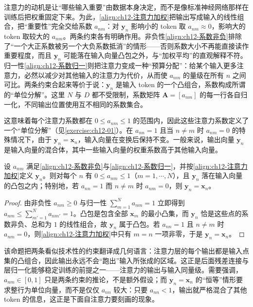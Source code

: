 \documentclass[../../main.tex]{subfiles}
\begin{document}
\begin{remark}
注意力的动机是让“哪些输入重要”由数据本身决定，而不是像标准神经网络那样在训练后把权重固定下来。为此，\eqref{align:ch12-注意力加权}把输出写成输入的线性组合，把“重要性”完全交给系数 $a_{nm}$：对 $\mathbf{y}_n$ 影响小的 token 取 $a_{nm}\approx0$，影响大的 token 取较大的 $a_{nm}$。两条约束各有明确作用。非负性\eqref{align:ch12-系数非负}排除了“一个大正系数被另一个大负系数抵消”的情形——否则系数大小不再能直接读作重要程度，而且 $\mathbf{y}_n$ 可能落在输入向量凸包之外，与“加权平均”的直观解释不符。归一性\eqref{align:ch12-系数归一}则把注意力变成一种“预算分配”：给某个输入更多注意力，必然以减少对其他输入的注意力为代价，从而使 $a_{nm}$ 的量级在所有 $n$ 之间可比。两条约束合起来等价于说：$\mathbf{y}_n$ 是输入 token 的一个凸组合，系数构成所谓的“单位分解”。这里 $N$ 与 $D$ 都不受限制，系数矩阵 $\mathbf{A}=[a_{nm}]$ 的每一行各自归一化，不同输出位置使用互不相同的系数集合。
\end{remark}

这意味着每个注意力系数都在 $0\leqslant a_{nm}\leqslant1$ 的范围内，因此这些注意力系数定义了一个“单位分解”（见\cref{exercise:ch12-01}）。在 $a_{nn}=1$ 且当 $n\neq m$ 时 $a_{nm}=0$ 的特殊情况下，由于 $\mathbf{y}_n=\mathbf{x}_n$，输入向量在变换后保持不变。一般来说，输出向量 $\mathbf{y}_n$ 是输入向量的混合体，其中一些输入向量的权重系数高于其他输入向量。

\begin{proposition}[注意力系数构成单位分解]\label{proposition:ch12-单位分解}
设 $a_{nm}$ 满足\eqref{align:ch12-系数非负}与\eqref{align:ch12-系数归一}，并按\eqref{align:ch12-注意力加权}定义 $\mathbf{y}_n$。则对每个 $n$ 有 $0\leqslant a_{nm}\leqslant1$（$m=1,\cdots,N$），且 $\mathbf{y}_n$ 落在输入向量的凸包之内；特别地，若 $a_{nn}=1$ 而 $n\neq m$ 时 $a_{nm}=0$，则 $\mathbf{y}_n=\mathbf{x}_n$。
\end{proposition}

\begin{proof}
由非负性 $a_{nm}\geqslant0$ 与归一性 $\sum_{m=1}^{N}a_{nm}=1$ 立即得到 $a_{nm}\leqslant\sum_{m'=1}^{N}a_{nm'}=1$。凸包是包含全部 $\mathbf{x}_m$ 的最小凸集，而 $\mathbf{y}_n$ 恰是这些点的系数非负、总和为 $1$ 的线性组合，故 $\mathbf{y}_n$ 属于凸包。若 $a_{nn}=1$ 且 $n\neq m$ 时 $a_{nm}=0$，则\eqref{align:ch12-注意力加权}中只有 $m=n$ 一项非零，于是 $\mathbf{y}_n=\mathbf{x}_n$。
\end{proof}

\begin{remark}
该命题把两条看似技术性的约束翻译成几何语言：注意力层的每个输出都是输入点集的凸组合，因此输出永远不会“跑出”输入所张成的区域。这正是后面残差连接与层归一化能够稳定训练的前提之一——注意力的输出与输入同量级。需要强调，$a_{nm}\in[0,1]$ 只是两条约束的推论，不是额外假设；而 $\mathbf{y}_n=\mathbf{x}_n$ 的“恒等”情形要求整行为单位向量，而不是仅仅 $a_{nn}$ 较大：只要 $a_{nn}<1$，输出就严格混合了其他 token 的信息，这正是下面自注意力要刻画的现象。
\end{remark}
\end{document}
